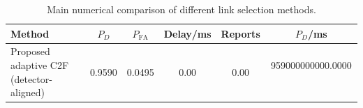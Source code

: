 \begin{table}[t]
    \centering
    \caption{Main numerical comparison of different link selection methods.}
    \label{tab:main_summary}
    \begin{tabular}{l c c c c c}
        \hline
        Method & $P_D$ & $P_{\mathrm{FA}}$ & Delay/ms & Reports & $P_D$/ms \\
        \hline
        Proposed adaptive C2F (detector-aligned) & 0.9590 & 0.0495 & 0.00 & 0.00 & 959000000000.0000 \
        \hline
    \end{tabular}
\end{table}
